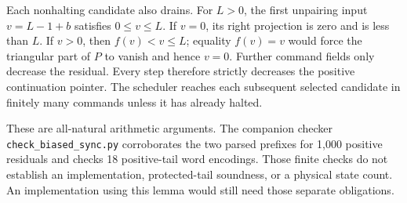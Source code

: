 Each nonhalting candidate also drains.  For $L>0$, the first unpairing
input $v=L-1+b$ satisfies $0\le v\le L$.  If $v=0$, its right projection
is zero and is less than $L$.  If $v>0$, then $f(v)<v\le L$; equality
$f(v)=v$ would force the triangular part of $P$ to vanish and hence
$v=0$.  Further command fields only decrease the residual.  Every step
therefore strictly decreases the positive continuation pointer.  The
scheduler reaches each subsequent selected candidate in finitely many
commands unless it has already halted.

These are all-natural arithmetic arguments.  The companion checker
\texttt{check\_biased\_sync.py} corroborates the two
parsed prefixes for 1,000 positive residuals and checks 18 positive-tail
word encodings.  Those finite checks do not establish an implementation,
protected-tail soundness, or a physical state count.  An implementation
using this lemma would still need those separate obligations.
